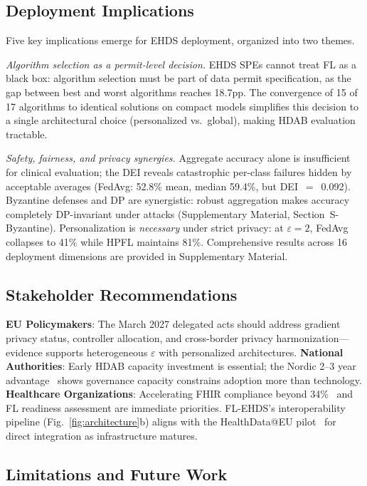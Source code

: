 \documentclass[conference]{IEEEtran}
\begin{document}
\subsection{Deployment Implications}

Five key implications emerge for EHDS deployment, organized into two themes.

\emph{Algorithm selection as a permit-level decision.} EHDS SPEs cannot treat FL as a black box: algorithm selection must be part of data permit specification, as the gap between best and worst algorithms reaches 18.7pp. The convergence of 15 of 17 algorithms to identical solutions on compact models simplifies this decision to a single architectural choice (personalized vs.\ global), making HDAB evaluation tractable.

\emph{Safety, fairness, and privacy synergies.} Aggregate accuracy alone is insufficient for clinical evaluation; the DEI reveals catastrophic per-class failures hidden by acceptable averages (FedAvg: 52.8\% mean, median 59.4\%, but DEI~$=$~0.092). Byzantine defenses and DP are synergistic: robust aggregation makes accuracy completely DP-invariant under attacks (Supplementary Material, Section~S-Byzantine). Personalization is \emph{necessary} under strict privacy: at $\varepsilon{=}2$, FedAvg collapses to 41\% while HPFL maintains 81\%. Comprehensive results across 16 deployment dimensions are provided in Supplementary Material.

\subsection{Stakeholder Recommendations}

\textbf{EU Policymakers}: The March 2027 delegated acts should address gradient privacy status, controller allocation, and cross-border privacy harmonization---evidence supports heterogeneous $\varepsilon$ with personalized architectures. \textbf{National Authorities}: Early HDAB capacity investment is essential; the Nordic 2--3 year advantage~\cite{tehdas2024ready} shows governance capacity constrains adoption more than technology. \textbf{Healthcare Organizations}: Accelerating FHIR compliance beyond 34\%~\cite{hussein2025interop} and FL readiness assessment are immediate priorities. FL-EHDS's interoperability pipeline (Fig.~\ref{fig:architecture}b) aligns with the HealthData@EU pilot~\cite{christiansen2025pilot} for direct integration as infrastructure matures.

\subsection{Limitations and Future Work}
\end{document}
